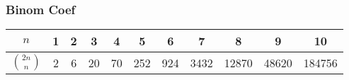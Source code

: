 
\subsubsection{Binom Coef}

\begin{center}
\begin{tabular}{c|c@{\ }c@{\ }c@{\ }c@{\ }c@{\ }c@{\ }c@{\ }c@{\ }c@{\ }c}
$n$            & 1 & 2 & 3 & 4  & 5   & 6   & 7    & 8     & 9     & 10\\
\hline
$\binom{2n}{n}$ & 2 & 6 & 20 & 70 & 252 & 924 & 3432 & 12870 & 48620 & 184756\\
\end{tabular}\\
\end{center}
